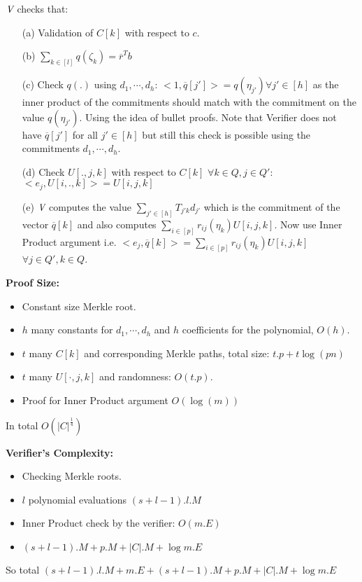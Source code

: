 $\textit{V}$ checks that:
\begin{itemize}
	\item[(a)] Validation of $C[k]$ with respect to $c$. 
	\item[(b)] $\sum\limits_{k\in [l]} q(\zeta_k)=\overline{r}^Tb$
	\item[(c)] Check $q(.)$ using $d_1,\cdots,d_h$: $<1,\overline{q}[j']>=q(\eta_{j'})\forall j'\in[h]$ as the inner product of the commitments should match with the commitment on the value $q(\eta_{j'})$. Using the idea of bullet proofs. Note that Verifier does not have $\overline{q}[j'] $ for all $j'\in[h]$ but still this check is possible using the commitments $d_1,\cdots, d_h$.
	\item[(d)] Check $U[.,j,k]$ with respect to $C[k]$ $\forall k\in Q,  j\in Q'$: $<e_j,U[i,.,k]>=U[i,j,k]$
	\item[(e)] $\textit{V}$ computes the value $\sum\limits_{j'\in[h]}T_{j'k}d_{j'}$ which is the commitment of the vector $\overline{q}[k]$ and also computes $\sum\limits_{i\in[p]} r_{ij}(\eta_k)U[i,j,k]$. Now use Inner Product argument i.e. $<e_j,\overline{q}[k]>=\sum\limits_{i\in[p]} r_{ij}(\eta_k)U[i,j,k]$ $\forall j\in Q', k\in Q$.
\end{itemize}
\textbf{Proof Size:}
\begin{itemize}
	\item Constant size Merkle root.
	\item $h$ many constants for $d_1,\cdots, d_h$ and $h$ coefficients for the polynomial, $O(h)$.
	\item $t$ many $C[k]$ and corresponding Merkle paths, total size: $t.p+ t\log(pn)$
	\item $t$ many $U[\cdot,j,k]$ and randomness: $O(t.p)$.
	\item Proof for Inner Product argument $O(\log(m))$
\end{itemize}
In total $O(|C|^{\frac{1}{4}})$

\textbf{Verifier's Complexity:} 
\begin{itemize}
	\item Checking Merkle roots.
	\item $l$ polynomial evaluations $(s+l-1).l.M$
	\item Inner Product check by the verifier: $O(m.E)$
	\item $(s+l-1).M+p.M+|C|.M+\log m. E$
\end{itemize}
So total $(s+l-1).l.M+ m.E+(s+l-1).M+p.M+|C|.M+\log m.E$


